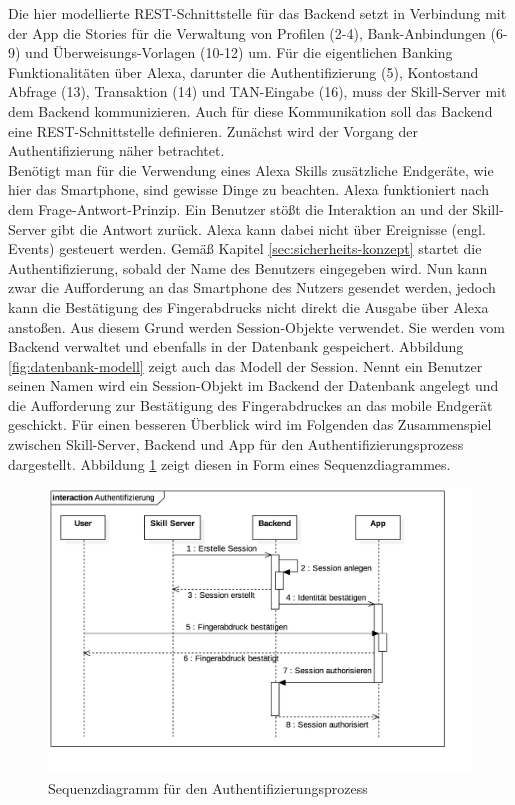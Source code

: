 Die hier modellierte \ac{REST}-Schnittstelle für das Backend setzt in Verbindung mit der App die Stories für die Verwaltung von Profilen (2-4), Bank-Anbindungen (6-9) und Überweisungs-Vorlagen (10-12) um. Für die eigentlichen Banking Funktionalitäten über Alexa, darunter die Authentifizierung (5), Kontostand Abfrage (13), Transaktion (14) und TAN-Eingabe (16), muss der Skill-Server mit dem Backend kommunizieren. Auch für diese Kommunikation soll das Backend eine \ac{REST}-Schnittstelle definieren. Zunächst wird der Vorgang der Authentifizierung näher betrachtet. \\
Benötigt man für die Verwendung eines Alexa Skills zusätzliche Endgeräte, wie hier das Smartphone, sind gewisse Dinge zu beachten. Alexa funktioniert nach dem Frage-Antwort-Prinzip. Ein Benutzer stößt die Interaktion an und der Skill-Server gibt die Antwort zurück. Alexa kann dabei nicht über Ereignisse (engl. Events) gesteuert werden. Gemäß Kapitel \ref{sec:sicherheits-konzept} startet die Authentifizierung, sobald der Name des Benutzers eingegeben wird. Nun kann zwar die Aufforderung an das Smartphone des Nutzers gesendet werden, jedoch kann die Bestätigung des Fingerabdrucks nicht direkt die Ausgabe über Alexa anstoßen. Aus diesem Grund werden Session-Objekte verwendet. Sie werden vom Backend verwaltet und ebenfalls in der Datenbank gespeichert. Abbildung \ref{fig:datenbank-modell} zeigt auch das Modell der Session. Nennt ein Benutzer seinen Namen wird ein Session-Objekt im Backend \bzw der Datenbank angelegt und die Aufforderung zur Bestätigung des Fingerabdruckes an das mobile Endgerät geschickt. Für einen besseren Überblick wird im Folgenden das Zusammenspiel zwischen Skill-Server, Backend und App für den Authentifizierungsprozess dargestellt. Abbildung \ref{fig:sequenz-authentifizierung} zeigt diesen in Form eines Sequenzdiagrammes. 

\begin{figure}[!htb]
    \centering
    \includegraphics[width=1.0\textwidth]{bilder/4_sequenzAuthentifizierung.png}
    \caption{Sequenzdiagramm für den Authentifizierungsprozess}
    \label{fig:sequenz-authentifizierung}
\end{figure}

